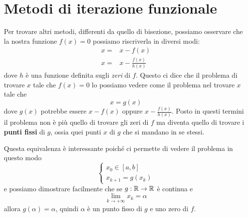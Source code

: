 \section{Metodi di iterazione funzionale}
Per trovare altri metodi, differenti da quello di bisezione, possiamo osservare che la nostra funzione
$f(x) = 0$ possiamo riscriverla in diversi modi:
\begin{align*}
	x = & x - f(x)              \\
	x = & x - \frac{f(x)}{h(x)}
\end{align*}
dove $h$ è una funzione definita sugli \emph{zeri} di $f$. Questo ci dice che il problema di trovare $x$ tale
che $f(x) = 0$ lo possiamo vedere come il problema nel trovare $x$ tale che
\[ x = g(x) \]
dove $g(x)$ potrebbe essere $x - f(x)$ oppure $x - \frac{f(x)}{h(x)}$. Posto in questi termini il problema non
è più quello di trovare gli zeri di $f$ ma diventa quello di trovare i \textbf{punti fissi} di $g$, ossia quei
punti $x$ di $g$ che si mandano in se stessi.

Questa equivalenza è interessante poiché ci permette di vedere il problema in questo modo
\[
	\begin{cases}
		x_0 \in [a, b] \\
		x_{k+1} = g(x_k)
	\end{cases}
\]
e possiamo dimostrare facilmente che se $g : \mathbb{R} \to \mathbb{R}$ è continua e
\[ \lim_{k \to +\infty} x_{k} = \alpha \]
allora $g(\alpha) = \alpha$, quindi $\alpha$ è un punto fisso di $g$ e uno zero di $f$.

